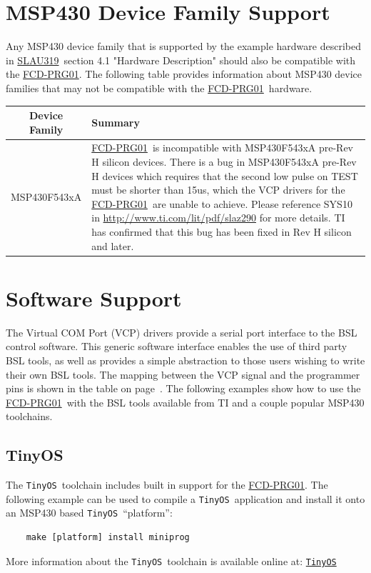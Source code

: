 \documentclass[10pt,letterpaper]{datasheet}
\newcommand{\PIDNOLINK}{FCD\nobreakdash-PRG01}
\newcommand{\PID}{\href{http://www.flyingcampdesign.com/msp430-bsl-programmer.html}{\PIDNOLINK}}
\newcommand{\tos}{\texttt{TinyOS}}
\newcommand{\tosurl}{\href{http://tinyos.net/}{\tos}}
\newcommand{\SLAUNOLINK}{SLAU319}
\newcommand{\SLAUPDF}{\href{http://www.ti.com/lit/pdf/SLAU319}{\SLAUNOLINK}}
\begin{document}
\newpage

\section*{MSP430 Device Family Support}
\begin{flushleft}
    Any MSP430 device family that is supported by the example hardware described in \SLAUPDF\ section 4.1 "Hardware Description" should also be compatible with the \PID.  The following table provides information about MSP430 device families that may not be compatible with the \PID\ hardware.
\end{flushleft}
\label{tab:msp430-device-support}
\begin{tabularx}{\textwidth}{|c|X|}
  \hline
  Device Family &
  Summary \\
  \hline
  MSP430F543xA & \PID\ is incompatible with MSP430F543xA pre-Rev H silicon devices.  There is a bug in MSP430F543xA pre-Rev H devices which requires that the second low pulse on TEST must be shorter than 15us, which the VCP drivers for the \PID\ are unable to achieve. Please reference SYS10 in \href{http://www.ti.com/lit/pdf/slaz290}{http://www.ti.com/lit/pdf/slaz290} for more details.  TI has confirmed that this bug has been fixed in Rev H silicon and later.\\
  \hline
\end{tabularx}

\newpage

\section*{Software Support}
\begin{flushleft}
The Virtual COM Port (VCP) drivers provide a serial port interface to the BSL control software.  This generic software interface enables the use of third party BSL tools, as well as provides a simple abstraction to those users wishing to write their own BSL tools.  The mapping between the VCP signal and the programmer pins is shown in the table on page~\pageref{tab:pinout}.  The following examples show how to use the \PID\ with the BSL tools available from TI and a couple popular MSP430 toolchains.

\subsection*{TinyOS}
The \tos\ toolchain includes built in support for the \PID.  The following example can be used to compile a \tos\ application and install it onto an MSP430 based \tos\ ``platform'':
\begin{verbatim}
    make [platform] install miniprog
\end{verbatim}
More information about the \tos\ toolchain is available online at: \tosurl
\end{flushleft}
\end{document}
